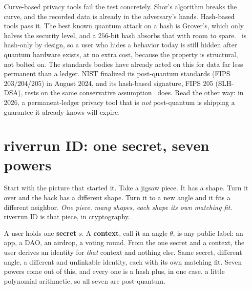 \documentclass[11pt]{article}
\begin{document}
Curve-based privacy tools fail the test concretely. Shor's algorithm breaks the curve,
and the recorded data is already in the adversary's hands. Hash-based tools pass it. The
best known quantum attack on a hash is Grover's, which only halves the security level,
and a $256$-bit hash absorbs that with room to spare. \river\ is hash-only by design, so
a user who hides a behavior today is still hidden after quantum hardware exists, at no
extra cost, because the property is structural, not bolted on. The standards bodies have
already acted on this for data far less permanent than a ledger. NIST finalized its
post-quantum standards (FIPS 203/204/205) in August 2024, and its hash-based signature,
FIPS 205 (SLH-DSA), rests on the same conservative assumption \river\ does. Read the
other way: in 2026, a permanent-ledger privacy tool that is \emph{not} post-quantum is
shipping a guarantee it already knows will expire.

\section{riverrun ID: one secret, seven powers}
\label{sec:id}

Start with the picture that started it. Take a jigsaw piece. It has a shape. Turn it
over and the back has a different shape. Turn it to a new angle and it fits a different
neighbor. \emph{One piece, many shapes, each shape its own matching fit.} riverrun ID is
that piece, in cryptography.

A user holds one \textbf{secret} $s$. A \textbf{context}, call it an angle $\theta$, is
any public label: an app, a DAO, an airdrop, a voting round. From the one secret and a
context, the user derives an identity for \emph{that} context and nothing else. Same
secret, different angle, a different and unlinkable identity, each with its own matching
fit. Seven powers come out of this, and every one is a hash plus, in one case, a little
polynomial arithmetic, so all seven are post-quantum.
\end{document}
